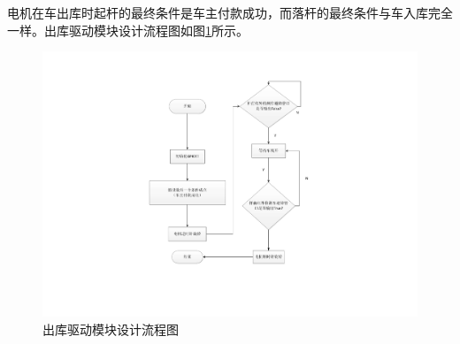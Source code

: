 电机在车出库时起杆的最终条件是车主付款成功，而落杆的最终条件与车入库完全一样。出库驱动模块设计流程图如图\ref{fig:出库驱动模块设计流程图}所示。

\begin{figure}[htbp]
	\centering
	\includegraphics[width=\textwidth]{figure/software-6.pdf}
	\caption{出库驱动模块设计流程图}\label{fig:出库驱动模块设计流程图}
\end{figure}
